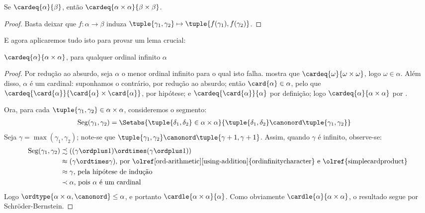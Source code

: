 \documentclass[../../../include/open-logic-section]{subfiles}
\begin{document}
\begin{prop}
Se $\cardeq{\alpha}{\beta}$, então $\cardeq{\alpha \times \alpha}{\beta
\times \beta}$. 
\end{prop}

\begin{proof}
Basta deixar que $f \colon \alpha \to \beta$ induza $\tuple{\gamma_1,
\gamma_2} \mapsto \tuple{f(\gamma_1), f(\gamma_2)}$.
\end{proof}
\noindent
E agora aplicaremos tudo isto para provar um lema crucial:
\begin{lem}
$\cardeq{\alpha}{\alpha \times \alpha}$, para qualquer ordinal infinito
$\alpha$
\end{lem}

\begin{proof}
Por redução ao absurdo, seja $\alpha$ o menor ordinal infinito para o qual
isto falha.  mostra
que $\cardeq{\omega}{\omega\times\omega}$, logo $\omega \in \alpha$.
Além disso, $\alpha$ é um cardinal: suponhamos o contrário, por redução ao absurdo;
então $\card{\alpha} \in \alpha$, pelo que
$\cardeq{\card{\alpha}}{\card{\alpha} \times \card{\alpha}}$, por
hipótese; e $\cardeq{\card{\alpha}}{\alpha}$ por definição; logo
$\cardeq{\alpha}{\alpha\times\alpha}$ por
. 

Ora, para cada $\tuple{\gamma_1, \gamma_2} \in \alpha \times \alpha$,
consideremos o segmento:
\begin{align*}
	\text{Seg}(\gamma_1, \gamma_2) &= \Setabs{\tuple{\delta_1, \delta_2} \in \alpha \times \alpha}{\tuple{\delta_1, \delta_2} \canonord \tuple{\gamma_1, \gamma_2}}
\end{align*}
Seja $\gamma = \max(\gamma_1, \gamma_2)$; note-se que $\tuple{\gamma_1, \gamma_2} \canonord \tuple{\gamma+1, \gamma + 1}$. Assim, quando $\gamma$ é infinito, observe-se:
\begin{align*}
	\text{Seg}(\gamma_1, \gamma_2) & 
	\precsim ((\gamma \ordplus 1)\ordtimes (\gamma \ordplus 1))\\
	&\approx (\gamma \ordtimes \gamma)
	\text{, por \olref[ord-arithmetic][using-addition]{ordinfinitycharacter} e 
	\olref{simplecardproduct}}\\
	&\approx \gamma \text{, pela hipótese de indução}\\
	& \prec \alpha\text{, pois $\alpha$ é um cardinal}
\end{align*}
Logo $\ordtype{\alpha\times \alpha, \canonord} \leq \alpha$, e portanto
$\cardle{\alpha \times \alpha}{\alpha}$. Como obviamente
$\cardle{\alpha}{\alpha \times \alpha}$, o resultado segue por
Schr\"oder-Bernstein. 
\end{proof}
\end{document}
